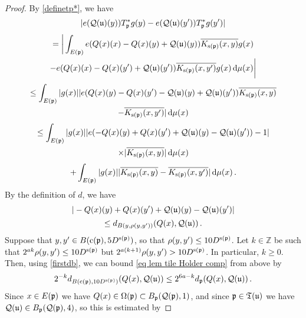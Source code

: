 {    \begin{proof}
        By \eqref{definetp*}, we have
        $$
            |e(\mathcal{Q}(\mathfrak u)(y)) T_{\mathfrak p}^* g(y) - e(\mathcal{Q}(\mathfrak u)(y')) T_{\mathfrak p}^* g(y')|
        $$
        \begin{multline*}
            =\bigg| \int_{E(\mathfrak p)} e({Q}(x)(x) - {Q}(x)(y) + \mathcal{Q}(\mathfrak u)(y)) \overline{K_{\mathrm{s}(\mathfrak p)}(x, y)} g(x) \\
            -  e({Q}(x)(x) - {Q}(x)(y') + \mathcal{Q}(\mathfrak u)(y')) \overline{K_{\mathrm{s}(\mathfrak p)}(x, y')}  g(x) \, \mathrm{d}\mu(x)\bigg|
        \end{multline*}
        \begin{multline*}
            \leq\int_{E(\mathfrak p)} |g(x)| |e({Q}(x)(y) - {Q}(x)(y') - \mathcal{Q}(\mathfrak u)(y) + \mathcal{Q}(\mathfrak u)(y'))\overline{K_{\mathrm{s}(\mathfrak p)}(x, y)}\\
            - \overline{K_{\mathrm{s}(\mathfrak p)}(x, y')}| \, \mathrm{d}\mu(x)
        \end{multline*}
        \begin{multline}
            \leq\int_{E(\mathfrak p)} |g(x)| |e(-{Q}(x)(y) + {Q}(x)(y') + \mathcal{Q}(\mathfrak u)(y) - \mathcal{Q}(\mathfrak u)(y')) - 1| \\
            \times |\overline{K_{\mathrm{s}(\mathfrak p)}(x, y)}|\, \mathrm{d}\mu(x) \label{T*Hölder1b}
        \end{multline}
        \begin{equation}
            + \int_{E(\mathfrak p)} |g(x)| |\overline{K_{\mathrm{s}(\mathfrak p)}(x, y)} - \overline{K_{\mathrm{s}(\mathfrak p)}(x, y')} |\, \mathrm{d}\mu(x)\,.\label{T*Hölder1}
        \end{equation}
        By the definition of $d$, we have
        $$
            |-{Q}(x)(y) + {Q}(x)(y') + \mathcal{Q}(\mathfrak u)(y) - \mathcal{Q}(\mathfrak u)(y')|
        $$
        \begin{equation}
            \label{eq lem tile Holder comp}
            \le d_{B(y, \rho(y,y'))}({Q}(x), \mathcal{Q}(\mathfrak u))\,.
        \end{equation}
        Suppose that $y, y' \in B(\mathrm{c}(\mathfrak p), 5D^{\mathrm{s}(\mathfrak p)})$, so that $\rho(y,y') \le 10D^{\mathrm{s}(\mathfrak p)}$. Let $k \in \mathbb{Z}$ be such that $2^{ak}\rho(y,y') \le 10D^{\mathrm{s}(\mathfrak p)}$ but $2^{a(k+1)} \rho(y,y') > 10D^{\mathrm{s}(\mathfrak p)}$. In particular, $k \ge 0$. Then, using \eqref{firstdb}, we can bound \eqref{eq lem tile Holder comp} from above by
        $$
            2^{-k} d_{B(\mathrm{c}(\mathfrak p), 10 D^{\mathrm{s}(\mathfrak p)})}({Q}(x), \mathcal{Q}(\mathfrak u)) \le 2^{6a - k} d_{\mathfrak p}({Q}(x), \mathcal{Q}(\mathfrak u))\,.
        $$
        Since $x \in E(\mathfrak p)$ we have ${Q}(x) \in \Omega(\mathfrak p) \subset B_{\mathfrak p}(\mathcal{Q}(\mathfrak p), 1)$, and since $\mathfrak p \in \mathfrak T(\mathfrak u)$ we have $\mathcal{Q}(\mathfrak u) \in B_{\mathfrak p}(\mathcal{Q}(\mathfrak p), 4)$, so this is estimated by

\end{proof}}
